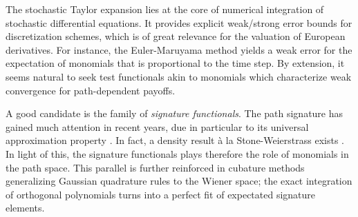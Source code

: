 

The stochastic Taylor expansion  \cite{KP} %
 lies at the core of numerical 
 integration of 
 stochastic differential equations.
It provides explicit weak/strong 
error bounds for discretization
schemes, which is of great relevance for the valuation of European derivatives. %
For instance, the Euler-Maruyama method \cite{Maruyama} yields a weak error for the expectation of monomials %
that is proportional to the time step.  %
By extension, it seems natural to seek %
test functionals akin to monomials which characterize weak convergence for path-dependent payoffs. 

A good candidate is the family of \textit{signature functionals}. The path signature has gained much attention in recent years, due in particular %
to its universal approximation property \cite{LyonsNum,Szpruch}. In fact, a density result à la Stone-Weierstrass exists \cite{Hao}. %
In light of this, the signature functionals
plays therefore the role of monomials in the path space. %
This parallel is further reinforced %
in cubature methods \cite{LyonsVictoir,Crisan}   generalizing Gaussian quadrature rules to the Wiener space; %
the exact integration of orthogonal polynomials 
turns into a perfect fit of expectated signature elements. \bb{+ \ldots}

